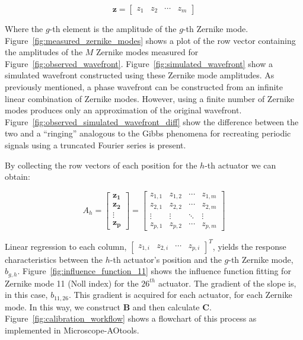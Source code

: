 \begin{equation}\label{eq:zernike_amp}
\boldsymbol{z} = 
\begin{bmatrix}
z_{1} & z_{2} & \cdots & z_{m} 
\end{bmatrix}
\end{equation}

Where the $g$-th element is the amplitude of the $g$-th
Zernike mode. Figure~\ref{fig:measured_zernike_modes} shows
a plot of the row vector containing the amplitudes of the 
$M$ Zernike modes measured for Figure~\ref{fig:observed_wavefront}.
Figure~\ref{fig:simulated_wavefront} show a simulated wavefront 
constructed using these Zernike mode amplitudes. As previously 
mentioned, a phase wavefront can be constructed from an 
infinite linear combination of Zernike modes\cite{noll1976zernike}. 
However, using a finite number of Zernike modes produces only an 
approximation of the original wavefront. 
Figure~\ref{fig:observed_simulated_wavefront_diff} show the
difference between the two and a ``ringing'' analogous to the 
Gibbs phenomena for recreating periodic signals using a
truncated Fourier series is present.

By collecting the row vectors of each position
for the $h$-th actuator we can obtain:

\begin{equation}\label{eq:zernike_amp_actuator}
A_h = 
\begin{bmatrix}
\boldsymbol{z_{1}}\\
\boldsymbol{z_{2}}\\
\vdots\\
\boldsymbol{z_{p}} 
\end{bmatrix}
=
\begin{bmatrix}
z_{1,1} & z_{1,2} & \cdots & z_{1,m} \\
z_{2,1} & z_{2,2} & \cdots & z_{2,m} \\
\vdots  & \vdots  & \ddots & \vdots  \\
z_{p,1} & z_{p,2} & \cdots & z_{p,m} 
\end{bmatrix}
\end{equation}

Linear regression to each column, $\begin{bmatrix} z_{1,i} & z_{2,i} & \cdots & z_{p,i} \end{bmatrix}^T$, yields the response characteristics between the $h$-th actuator's position and the $g$-th Zernike mode, $b_{g,h}$. Figure~\ref{fig:influence_function_11} shows the influence function fitting for Zernike mode 11 (Noll index) for the $26^{th}$ actuator. The gradient of the slope is, in this case, $b_{11,26}$. This gradient is acquired for each actuator, for each Zernike mode. In this way, we construct $\boldsymbol{B}$ and then calculate $\boldsymbol{C}$. Figure~\ref{fig:calibration_workflow} shows a flowchart of this process as implemented in Microscope-AOtools.

